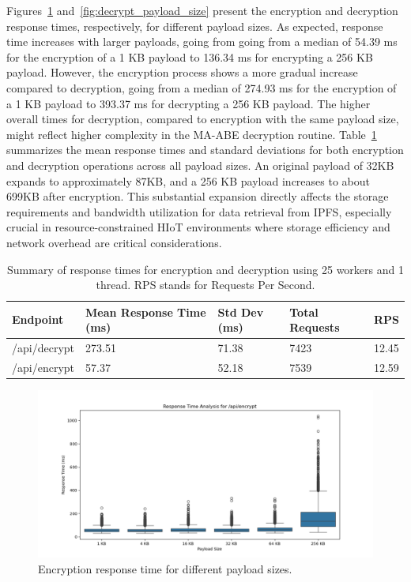 \documentclass[cic,tc,english]{iiufrgs}
\numberwithin{algorithm}{chapter}
\begin{document}
            Figures~\ref{fig:encrypt_payload_size} and~\ref{fig:decrypt_payload_size} present the encryption and decryption response times, respectively, for different payload sizes. As expected, response time increases with larger payloads, going from going from a median of 54.39 ms for the encryption of a 1 KB payload to 136.34 ms for encrypting a 256 KB payload. However, the encryption process shows a more gradual increase compared to decryption, going from a median of 274.93 ms for the encryption of a 1 KB payload to 393.37 ms for decrypting a 256 KB payload. The higher overall times for decryption, compared to encryption with the same payload size, might reflect higher complexity in the MA-ABE decryption routine. Table~\ref{tab:response_times} summarizes the mean response times and standard deviations for both encryption and decryption operations across all payload sizes. An original payload of 32KB expands to approximately 87KB, and a 256 KB payload increases to about 699KB after encryption. This substantial expansion directly affects the storage requirements and bandwidth utilization for data retrieval from IPFS, especially crucial in resource-constrained HIoT environments where storage efficiency and network overhead are critical considerations. 

            \begin{table}
                \centering
                \begin{tabular}{|l|l|l|l|l|}
                \hline
                    Endpoint & Mean Response Time (ms) & Std Dev (ms) & Total Requests & RPS \\ \hline
                    /api/decrypt & 273.51 & 71.38 & 7423 & 12.45 \\ \hline
                    /api/encrypt & 57.37 & 52.18 & 7539 & 12.59 \\ \hline
                \end{tabular}
                \caption{Summary of response times for encryption and decryption using 25 workers and 1 thread. RPS stands for Requests Per Second.}
                \label{tab:response_times}
            \end{table}

            

            \begin{figure}
                \centering
                \includegraphics[width=\textwidth]{images/phase2/response_time_api_encrypt.png}
                \caption{Encryption response time for different payload sizes.}
                \label{fig:encrypt_payload_size}
            \end{figure}
\end{document}
